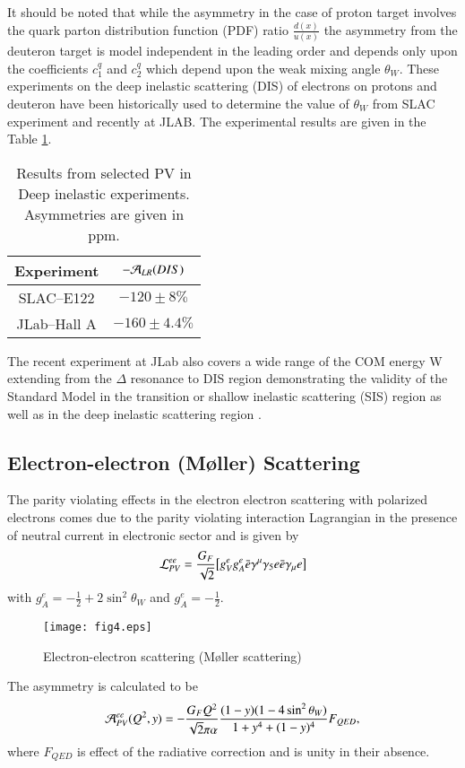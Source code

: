 It should be noted that while the asymmetry in the case of proton target involves the quark  parton distribution function (PDF) ratio $\frac{d(x)}{u(x)}$ the asymmetry from the deuteron target is  model independent in the leading order and depends only upon the coefficients $c_1^q$ and $c_2^q$ which depend upon the weak mixing angle $\theta_W$. These experiments on the deep inelastic scattering (DIS) of electrons on protons and deuteron have been historically used to determine the value of $\theta_W$ from SLAC experiment and recently at JLAB. The experimental results are given in the Table \ref{WS:asymm_tbl_DIS}.
\begin{table}
\begin{center}
\begin{tabular}{|c|c|} \hline
Experiment & $-{\cal A}_{LR}(DIS)$ \\ \hline
SLAC--E122&$-120\pm8\%$\\ \hline
JLab--Hall A&$-160\pm 4.4\%$ \\ \hline
\end{tabular}
\caption{Results from selected PV in Deep inelastic  experiments. Asymmetries are given in ppm.}
\label{WS:asymm_tbl_DIS}
\end{center}
\end{table}


The recent experiment at JLab also covers a wide range of the COM energy W extending from the $\Delta$ resonance to DIS region demonstrating the validity of the Standard Model in the transition or shallow inelastic scattering (SIS) region as well as in the deep inelastic scattering region \cite{nature:wang}.
    
\subsection{Electron-electron (M\o ller) Scattering}


The parity violating effects in the electron electron scattering with polarized electrons comes due to the parity violating interaction Lagrangian in the presence of neutral current in electronic sector and is given by 
\begin{equation}
{\cal L}_{PV}^{ee}= \frac{G_F}{\sqrt{2}}\big[g_V^eg_A^e  \bar{e} \gamma^\mu \gamma_5 e\bar{e}\gamma_\mu e\big]
\end{equation}
 with $g_A^e =-\frac{1}{2}+2\sin^2\theta_W$ and $g_A^e=-\frac{1}{2}$.
 \begin{figure}
  \begin{center}
      \texttt{[image: fig4.eps]}
      \caption{Electron-electron scattering (M\o ller scattering)}
      \label{Fig:moller}
    \end{center}
    \end{figure}
The asymmetry is calculated to be
\begin{equation}
{\cal A}_{PV}^{ee}(Q^2,y)= -\frac{G_F Q^2}{\sqrt{2}\pi\alpha} \frac{(1-y)(1-4\sin^2\theta_W)}{1+y^4+(1-y)^4} F_{QED},
\end{equation}
where  $F_{QED}$ is effect of the radiative correction and is unity in their absence. 

